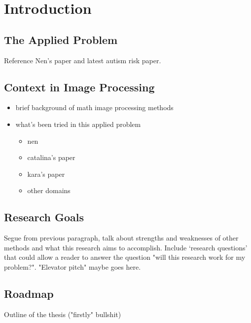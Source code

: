 
\chapter{Introduction}

	\section{The Applied Problem}
		Reference Nen's paper and latest autism risk paper.
	\section{Context in Image Processing}

		\begin{itemize}
			\item brief background of math image processing methods
			\item what's been tried in this applied problem
			\begin{itemize}
				\item nen \cite{huynh2013filter}
				\item catalina's paper
				\item kara's paper
				\item other domains
			\end{itemize}
		\end{itemize}
	\section{Research Goals}
	Segue from previous paragraph, talk about strengths and weaknesses of other methods and what this research aims to accomplish. Include `research questions' that could allow a reader to answer the question "will this research work for my problem?". "Elevator pitch" maybe goes here.
	\section{Roadmap}
	Outline  of the thesis ("firstly" bullshit)
